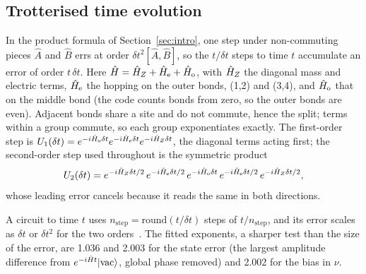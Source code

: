 \subsection{Trotterised time evolution}

In the product formula of Section~\ref{sec:intro}, one step under
non-commuting pieces $\hat A$ and $\hat B$ errs at order
$\delta t^2[\hat A,\hat B]$, so the $t/\delta t$ steps to time $t$ accumulate an
error of order $t\,\delta t$. Here $\hat{H} = \hat{H}_Z + \hat{H}_{\mathrm{e}} +
\hat{H}_{\mathrm{o}}$, with $\hat{H}_Z$ the diagonal mass and electric terms,
$\hat{H}_{\mathrm{e}}$ the hopping on the outer bonds, (1,2) and (3,4), and
$\hat{H}_{\mathrm{o}}$ that on the middle bond (the code counts bonds from zero,
so the outer bonds are even). Adjacent bonds share a site and do not commute,
hence the split; terms within a group commute, so each group exponentiates
exactly.
The first-order step is
$U_1(\delta t) = e^{-i\hat{H}_{\mathrm{o}}\delta t}e^{-i\hat{H}_{\mathrm{e}}\delta t}e^{-i\hat{H}_Z\delta t}$,
the diagonal terms acting first;
the second-order step used throughout is the symmetric product
\begin{equation}
  \label{eq:strang}
  U_2(\delta t) = e^{-i\hat{H}_Z\delta t/2}\,e^{-i\hat{H}_{\mathrm{e}}\delta t/2}\,
                  e^{-i\hat{H}_{\mathrm{o}}\delta t}\,
                  e^{-i\hat{H}_{\mathrm{e}}\delta t/2}\,e^{-i\hat{H}_Z\delta t/2},
\end{equation}
whose leading error cancels because it reads the same in both directions.

A circuit to time $t$ uses $n_{\mathrm{step}} = \mathrm{round}(t/\delta t)$ steps of
$t/n_{\mathrm{step}}$, and
its error scales as $\delta t$ or $\delta t^2$ for the two
orders~\cite{suzuki1976,childs2021}. The fitted exponents, a sharper test than
the size of the error, are 1.036 and 2.003 for the state error (the largest
amplitude difference from $e^{-i\hat{H} t}|\mathrm{vac}\rangle$, global phase
removed) and 2.002 for the bias in $\nu$.

